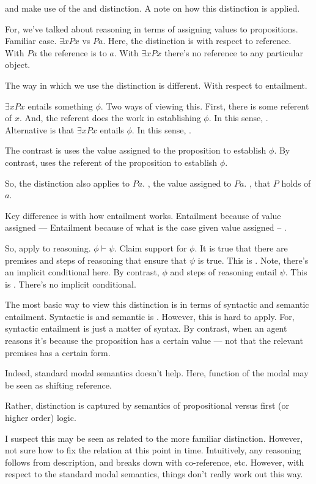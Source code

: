 \begin{note}[\dd{} and \dr{}]
  \color{red}
  \AR{} and \WR{} make use of the \dd{} and \dr{} distinction.
  A note on how this distinction is applied.

  For, we've talked about reasoning in terms of assigning values to propositions.
  Familiar case.
  \(\exists xPx\) vs \(Pa\).
  Here, the distinction is with respect to reference.
  With \(Pa\) the reference is to \(a\).
  With \(\exists xPx\) there's no reference to any particular object.

  The way in which we use the distinction is different.
  With respect to entailment.

  \(\exists xPx\) entails something \(\phi\).
  Two ways of viewing this.
  First, there is some referent of \(x\).
  And, the referent does the work in establishing \(\phi\).
  In this sense, \dr{}.
  Alternative is that \(\exists xPx\) entails \(\phi\).
  In this sense, \dd{}.

  The contrast is \dd{} uses the value assigned to the proposition to establish \(\phi\).
  By contrast, \dr{} uses the referent of the proposition to establish \(\phi\).

  So, the distinction also applies to \(Pa\).
  \dd{}, the value assigned to \(Pa\).
  \dr{}, that \(P\) holds of \(a\).

  Key difference is with how entailment works.
  Entailment because of value assigned --- \dd{}
  Entailment because of what is the case given value assigned -- \dr{}.

  So, apply to reasoning.
  \(\phi \vdash \psi\).
  Claim support for \(\phi\).
  It is true that there are premises and steps of reasoning that ensure that \(\psi\) is true.
  This is \dd{}.
  Note, there's an implicit conditional here.
  By contrast, \(\phi\) and steps of reasoning entail \(\psi\).
  This is \dr{}.
  There's no implicit conditional.

  The most basic way to view this distinction is in terms of syntactic and semantic entailment.
  Syntactic is \dd{} and semantic is \dr{}.
  However, this is hard to apply.
  For, syntactic entailment is just a matter of syntax.
  By contrast, when an agent reasons \dd{} it's because the proposition has a certain value --- not that the relevant premises has a certain form.

  Indeed, standard modal semantics doesn't help.
  Here, function of the modal may be seen as shifting reference.

  Rather, distinction is captured by semantics of propositional versus first (or higher order) logic.

  I suspect this may be seen as related to the more familiar distinction.
  However, not sure how to fix the relation at this point in time.
  Intuitively, any reasoning follows from description, and breaks down with co-reference, etc.
  However, with respect to the standard modal semantics, things don't really work out this way.
\end{note}

